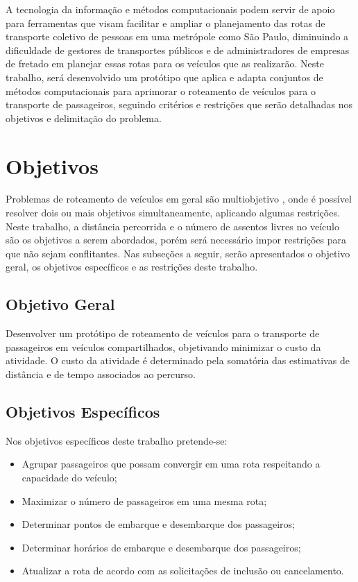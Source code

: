 A tecnologia da informação e métodos computacionais podem servir de apoio para ferramentas que visam facilitar e ampliar o planejamento das rotas de transporte coletivo de pessoas em uma metrópole como São Paulo, diminuindo a dificuldade de gestores de transportes públicos e de administradores de empresas de fretado em planejar essas rotas para os veículos que as realizarão. Neste trabalho, será desenvolvido um protótipo que aplica e adapta conjuntos de métodos computacionais para aprimorar o roteamento de veículos para o transporte de passageiros, seguindo critérios e restrições que serão detalhadas nos objetivos e delimitação do problema.

\section{Objetivos}

Problemas de roteamento de veículos em geral são multiobjetivo \cite[p. 279]{goldbarg}, onde é possível resolver dois ou mais objetivos simultaneamente, aplicando algumas restrições\cite[p. 2]{multi-objetivo}. Neste trabalho, a distância percorrida e o número de assentos livres no veículo são os objetivos a serem abordados, porém será necessário impor restrições para que não sejam conflitantes.
Nas subseções a seguir, serão apresentados o objetivo geral, os objetivos específicos e as restrições deste trabalho. 

\subsection{Objetivo Geral}

Desenvolver um protótipo de roteamento de veículos para o transporte de passageiros em veículos compartilhados, objetivando minimizar o custo da atividade. O custo da atividade é determinado pela somatória das estimativas de distância e de tempo associados ao percurso. 

\subsection{Objetivos Específicos}
Nos objetivos específicos deste trabalho pretende-se:
\begin{itemize}
    
    \item Agrupar passageiros que possam convergir em uma rota respeitando a capacidade do veículo;
    
    \item Maximizar o número de passageiros em uma mesma rota;
    
    \item Determinar pontos de embarque e desembarque dos passageiros;
    
    \item Determinar horários de embarque e desembarque dos passageiros;
    
    \item Atualizar a rota de acordo com as solicitações de inclusão ou cancelamento.
    
\end{itemize}

